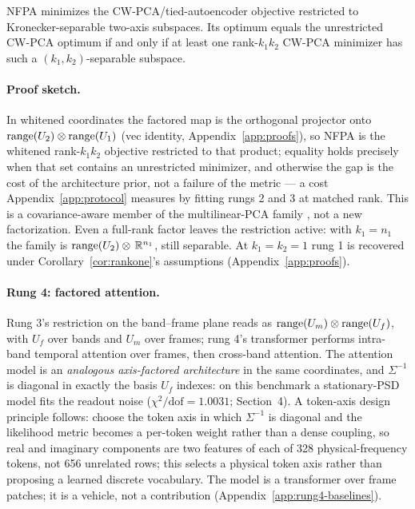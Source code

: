 \begin{proposition}
\label{prop:restricted}
NFPA minimizes the CW-PCA/tied-autoencoder objective restricted to Kronecker-separable two-axis subspaces. Its optimum equals the unrestricted CW-PCA optimum if and only if at least one rank-$k_1k_2$ CW-PCA minimizer has such a $(k_1,k_2)$-separable subspace.
\end{proposition}

\paragraph{Proof sketch.}
In whitened coordinates the factored map is the orthogonal projector onto $\mathrm{range}(U_2)\otimes\mathrm{range}(U_1)$ (vec identity, Appendix~\ref{app:proofs}), so NFPA is the whitened rank-$k_1k_2$ objective restricted to that product; equality holds precisely when that set contains an unrestricted minimizer, and otherwise the gap is the cost of the architecture prior, not a failure of the metric --- a cost Appendix~\ref{app:protocol} measures by fitting rungs 2 and 3 at matched rank. This is a covariance-aware member of the multilinear-PCA family \citep{lu2008mpca}, not a new factorization. Even a full-rank factor leaves the restriction active: with $k_1=n_1$ the family is $\mathrm{range}(U_2)\otimes\,\mathbb{R}^{n_1}$, still separable. At $k_1=k_2=1$ rung 1 is recovered under Corollary~\ref{cor:rankone}'s assumptions (Appendix~\ref{app:proofs}).

\paragraph{Rung 4: factored attention.}
Rung 3's restriction on the band--frame plane reads as $\mathrm{range}(U_m)\otimes\mathrm{range}(U_f)$, with $U_f$ over bands and $U_m$ over frames; rung 4's transformer performs intra-band temporal attention over frames, then cross-band attention. The attention model is an \emph{analogous axis-factored architecture} in the same coordinates, and $\Sigma^{-1}$ is diagonal in exactly the basis $U_f$ indexes: on this benchmark a stationary-PSD model fits the readout noise ($\chi^2/\mathrm{dof}=1.0031$; Section~4). A token-axis design principle follows: choose the token axis in which $\Sigma^{-1}$ is diagonal and the likelihood metric becomes a per-token weight rather than a dense coupling, so real and imaginary components are two features of each of 328 physical-frequency tokens, not 656 unrelated rows; this selects a physical token axis rather than proposing a learned discrete vocabulary. The model is a transformer \citep{vaswani2017attention} over frame patches; it is a vehicle, not a contribution (Appendix~\ref{app:rung4-baselines}).
